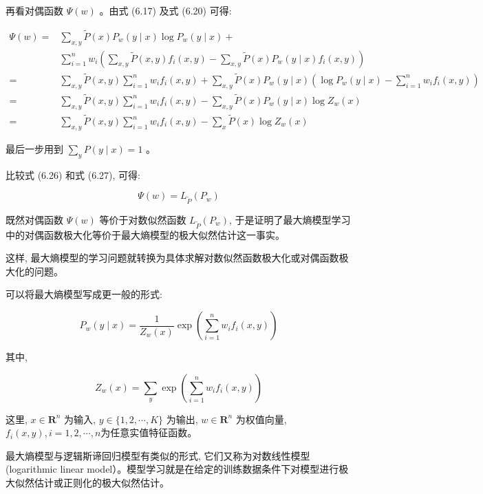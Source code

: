 \documentclass[10pt]{article}
\begin{document}
\begin{CJK*}{UTF8}{bsmi}
再看对偶函数 $\Psi(w)$ 。由式 (6.17) 及式 (6.20) 可得:


\begin{align*}
\Psi(w)= & \sum_{x, y} \tilde{P}(x) P_{w}(y \mid x) \log P_{w}(y \mid x)+ \\
& \sum_{i=1}^{n} w_{i}\left(\sum_{x, y} \tilde{P}(x, y) f_{i}(x, y)-\sum_{x, y} \tilde{P}(x) P_{w}(y \mid x) f_{i}(x, y)\right) \\
= & \sum_{x, y} \tilde{P}(x, y) \sum_{i=1}^{n} w_{i} f_{i}(x, y)+\sum_{x, y} \tilde{P}(x) P_{w}(y \mid x)\left(\log P_{w}(y \mid x)-\sum_{i=1}^{n} w_{i} f_{i}(x, y)\right) \\
= & \sum_{x, y} \tilde{P}(x, y) \sum_{i=1}^{n} w_{i} f_{i}(x, y)-\sum_{x, y} \tilde{P}(x) P_{w}(y \mid x) \log Z_{w}(x) \\
= & \sum_{x, y} \tilde{P}(x, y) \sum_{i=1}^{n} w_{i} f_{i}(x, y)-\sum_{x} \tilde{P}(x) \log Z_{w}(x) \tag{6.27}
\end{align*}


最后一步用到 $\sum_{y} P(y \mid x)=1$ 。

比较式 (6.26) 和式 (6.27), 可得:

$$
\Psi(w)=L_{\tilde{P}}\left(P_{w}\right)
$$

既然对偶函数 $\Psi(w)$ 等价于对数似然函数 $L_{\tilde{P}}\left(P_{w}\right)$, 于是证明了最大熵模型学习中的对偶函数极大化等价于最大熵模型的极大似然估计这一事实。

这样, 最大熵模型的学习问题就转换为具体求解对数似然函数极大化或对偶函数极大化的问题。

可以将最大熵模型写成更一般的形式:


\begin{equation*}
P_{w}(y \mid x)=\frac{1}{Z_{w}(x)} \exp \left(\sum_{i=1}^{n} w_{i} f_{i}(x, y)\right) \tag{6.28}
\end{equation*}


其中,


\begin{equation*}
Z_{w}(x)=\sum_{y} \exp \left(\sum_{i=1}^{n} w_{i} f_{i}(x, y)\right) \tag{6.29}
\end{equation*}


这里, $x \in \boldsymbol{R}^{n}$ 为输入, $y \in\{1,2, \cdots, K\}$ 为输出, $w \in \boldsymbol{R}^{n}$ 为权值向量, $f_{i}(x, y), i=1,2, \cdots, n$为任意实值特征函数。

最大熵模型与逻辑斯谛回归模型有类似的形式, 它们又称为对数线性模型 (logarithmic linear model）。模型学习就是在给定的训练数据条件下对模型进行极大似然估计或正则化的极大似然估计。


\end{CJK*}
\end{document}
